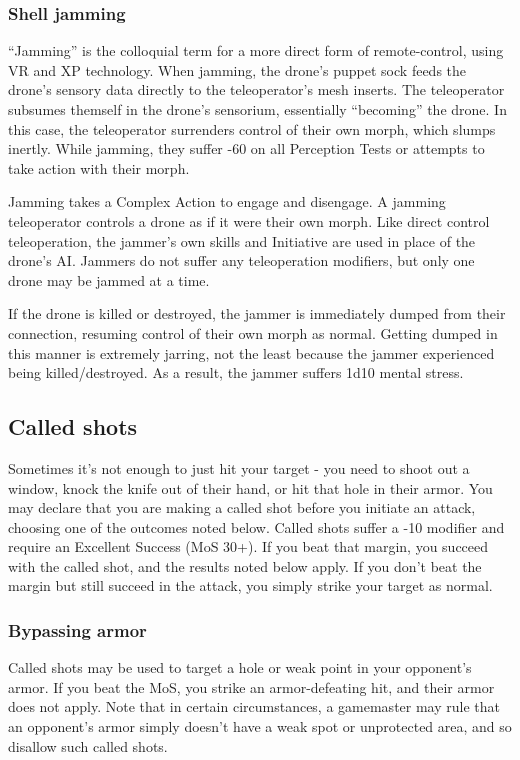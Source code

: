 \subsubsection{Shell jamming}

``Jamming'' is the colloquial term for a more direct form of remote-control, using VR and XP technology. When jamming, the drone’s puppet sock feeds the drone’s sensory data directly to the teleoperator’s mesh inserts. The teleoperator subsumes themself in the drone’s sensorium, essentially ``becoming'' the drone. In this case, the teleoperator surrenders control of their own morph, which slumps inertly. While jamming, they suffer -60 on all Perception Tests or attempts to take action with their morph.

Jamming takes a Complex Action to engage and disengage. A jamming teleoperator controls a drone as if it were their own morph. Like direct control teleoperation, the jammer’s own skills and Initiative are used in place of the drone’s AI. Jammers do not suffer any teleoperation modifiers, but only one drone may be jammed at a time.

If the drone is killed or destroyed, the jammer is immediately dumped from their connection, resuming control of their own morph as normal. Getting dumped in this manner is extremely jarring, not the least because the jammer experienced being killed/destroyed. As a result, the jammer suffers 1d10 mental stress.


\subsection{Called shots}
\label{sec:called-shots}

Sometimes it’s not enough to just hit your target -  you need to shoot out a window, knock the knife out of their hand, or hit that hole in their armor. You may declare that you are making a called shot before you initiate an attack, choosing one of the outcomes noted below. Called shots suffer a -10 modifier and require an Excellent Success (MoS 30+). If you beat that margin, you succeed with the called shot, and the results noted below apply. If you don’t beat the margin but still succeed in the attack, you simply strike your target as normal.

\subsubsection{Bypassing armor}

Called shots may be used to target a hole or weak point in your opponent’s armor. If you beat the MoS, you strike an armor-defeating hit, and their armor does not apply. Note that in certain circumstances, a gamemaster may rule that an opponent’s armor simply doesn’t have a weak spot or unprotected area, and so disallow such called shots.


